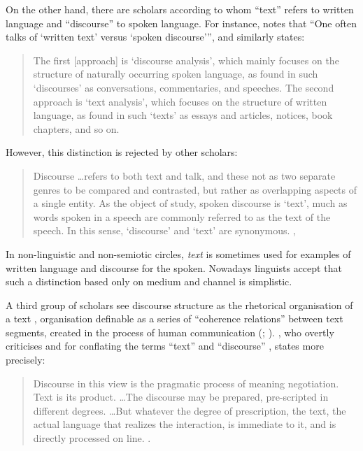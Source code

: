 \documentclass[output=paper]{LSP/langsci}
\begin{document}
On the other hand, there are scholars according to whom ``text'' refers to written language and ``discourse'' to spoken language. For instance, \citet[9]{Stubbs1983} notes that ``One often talks of `written text' versus `spoken discourse''', and similarly \citeauthor{Riazi2002} states: 

\begin{quote}
The first [approach] is `discourse analysis', which mainly focuses on the structure of naturally occurring spoken language, as found in such `discourses' as conversations, commentaries, and speeches. The second approach is `text analysis', which focuses on the structure of written language, as found in such `texts' as essays and articles, notices, book chapters, and so on. \citep[4]{Riazi2002} 
\end{quote}

However, this distinction is rejected by other scholars: 
\begin{quote} 
Discourse \ldots refers to both text and talk, and these not as two separate genres to be compared and contrasted, but rather as overlapping aspects of a single entity. As the object of study, spoken discourse is `text', much as words spoken in a speech are commonly referred to as the text of the speech. In this sense, `discourse' and `text' are synonymous. \citep[ix]{Tannen1982},
\end{quote}

In non-linguistic and non-semiotic circles, \textit{text} is sometimes used for examples of written language and discourse for the spoken. Nowadays linguists accept that such a distinction based only on medium and channel is simplistic. \citep[34]{Christiansen2011}

A third group of scholars see discourse structure as the rhetorical organisation of a text \citep{Mann1988}, organisation definable as a series of ``coherence relations'' \citep{Hobbs1985} between text segments, created in the process of human communication (\citealt[24--26]{Brown1983}; \citealt[71]{Widdowson1979}). \citet{Widdowson2004}, who overtly criticises \citet{Harris1952} and \citeauthor{Stubbs1983} for conflating the terms ``text'' and ``discourse'' \citep[4-5]{Widdowson2004}, states more precisely: 

\begin{quote}
Discourse in this view is the pragmatic process of meaning negotiation. Text is its product. \ldots  The discourse may be prepared, pre-scripted in different degrees. \ldots  But whatever the degree of prescription, the text, the actual language that realizes the interaction, is immediate to it, and is directly processed on line. \citep[8-9]{Widdowson2004}.
\end{quote}
\end{document}
